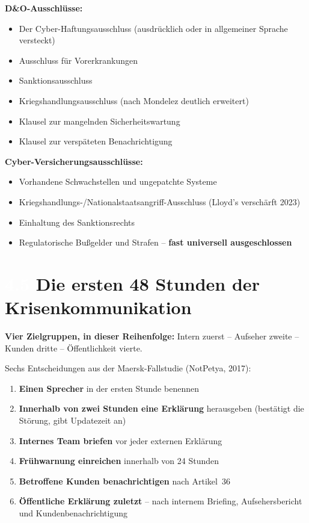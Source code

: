 \documentclass[11pt,a4paper,twoside]{book}
\newcommand{\lessontag}[1]{%
  \texorpdfstring{%
    \setlength{\fboxsep}{3pt}\colorbox{nisd2blue}{\textcolor{white}{\footnotesize\bfseries #1}}\quad%
  }{Lektion #1\ }%
}
\begin{document}
\textbf{D\&O-Ausschlüsse:}
\begin{itemize}
  \item Der Cyber-Haftungsausschluss (ausdrücklich oder in allgemeiner Sprache versteckt)
  \item Ausschluss für Vorerkrankungen
  \item Sanktionsausschluss
  \item Kriegshandlungsausschluss (nach Mondelez deutlich erweitert)
  \item Klausel zur mangelnden Sicherheitswartung
  \item Klausel zur verspäteten Benachrichtigung
\end{itemize}

\textbf{Cyber-Versicherungsausschlüsse:}
\begin{itemize}
  \item Vorhandene Schwachstellen und ungepatchte Systeme
  \item Kriegshandlungs-/Nationalstaatsangriff-Ausschluss (Lloyd's verschärft 2023)
  \item Einhaltung des Sanktionsrechts
  \item Regulatorische Bußgelder und Strafen -- \textbf{fast universell ausgeschlossen}
\end{itemize}

\section{\lessontag{4.5}Die ersten 48 Stunden der Krisenkommunikation}

\textbf{Vier Zielgruppen, in dieser Reihenfolge:} Intern zuerst -- Aufseher zweite -- Kunden dritte -- Öffentlichkeit vierte.

Sechs Entscheidungen aus der Maersk-Fallstudie (NotPetya, 2017):
\begin{enumerate}
  \item \textbf{Einen Sprecher} in der ersten Stunde benennen
  \item \textbf{Innerhalb von zwei Stunden eine Erklärung} herausgeben (bestätigt die Störung, gibt Updatezeit an)
  \item \textbf{Internes Team briefen} vor jeder externen Erklärung
  \item \textbf{Frühwarnung einreichen} innerhalb von 24 Stunden
  \item \textbf{Betroffene Kunden benachrichtigen} nach Artikel~36
  \item \textbf{Öffentliche Erklärung zuletzt} -- nach internem Briefing, Aufsehersbericht und Kundenbenachrichtigung
\end{enumerate}
\end{document}

